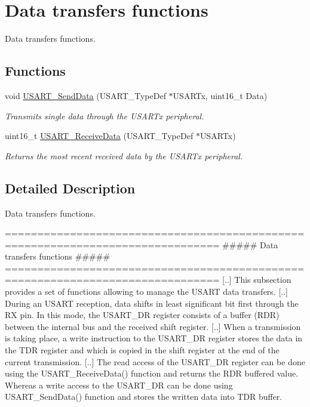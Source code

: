 \hypertarget{group___u_s_a_r_t___group2}{}\section{Data transfers functions}
\label{group___u_s_a_r_t___group2}


Data transfers functions.  


\subsection*{Functions}
\begin{DoxyCompactItemize}
\item 
void \mbox{\hyperlink{group___u_s_a_r_t___group2_ga0b43d42da9540f446d494bf69823c6fb}{U\+S\+A\+R\+T\+\_\+\+Send\+Data}} (U\+S\+A\+R\+T\+\_\+\+Type\+Def $\ast$U\+S\+A\+R\+Tx, uint16\+\_\+t Data)
\begin{DoxyCompactList}\small\item\em Transmits single data through the U\+S\+A\+R\+Tx peripheral. \end{DoxyCompactList}\item 
uint16\+\_\+t \mbox{\hyperlink{group___u_s_a_r_t___group2_gac67a91845b0b1d54d31bdfb1c5e9867c}{U\+S\+A\+R\+T\+\_\+\+Receive\+Data}} (U\+S\+A\+R\+T\+\_\+\+Type\+Def $\ast$U\+S\+A\+R\+Tx)
\begin{DoxyCompactList}\small\item\em Returns the most recent received data by the U\+S\+A\+R\+Tx peripheral. \end{DoxyCompactList}\end{DoxyCompactItemize}


\subsection{Detailed Description}
Data transfers functions. 

\begin{DoxyVerb} ===============================================================================
                      ##### Data transfers functions #####
 ===============================================================================  
    [..]
    This subsection provides a set of functions allowing to manage the USART data 
    transfers.
    [..]
    During an USART reception, data shifts in least significant bit first through 
    the RX pin. In this mode, the USART_DR register consists of a buffer (RDR) 
    between the internal bus and the received shift register.
    [..]
    When a transmission is taking place, a write instruction to the USART_DR register 
    stores the data in the TDR register and which is copied in the shift register 
    at the end of the current transmission.
    [..]
    The read access of the USART_DR register can be done using the USART_ReceiveData()
    function and returns the RDR buffered value. Whereas a write access to the USART_DR 
    can be done using USART_SendData() function and stores the written data into 
    TDR buffer.\end{DoxyVerb}
 

